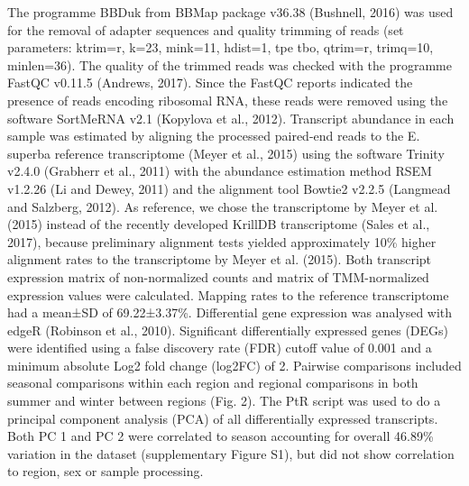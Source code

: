 The programme BBDuk from BBMap package v36.38 (Bushnell, 2016) was used for the
removal of adapter sequences and quality trimming of reads (set parameters:
ktrim=r, k=23, mink=11, hdist=1, tpe tbo, qtrim=r, trimq=10, minlen=36). The
quality of the trimmed reads was checked with the programme FastQC v0.11.5
(Andrews, 2017). Since the FastQC reports indicated the presence of reads
encoding ribosomal RNA, these reads were removed using the software SortMeRNA
v2.1 (Kopylova et al., 2012). Transcript abundance in each sample was estimated
by aligning the processed paired-end reads to the E. superba reference
transcriptome (Meyer et al., 2015) using the software Trinity v2.4.0 (Grabherr
et al., 2011) with the abundance estimation method RSEM v1.2.26 (Li and Dewey,
2011) and the alignment tool Bowtie2 v2.2.5 (Langmead and Salzberg, 2012). As
reference, we chose the transcriptome by Meyer et al. (2015) instead of the
recently developed KrillDB transcriptome (Sales et al., 2017), because
preliminary alignment tests yielded approximately 10\% higher alignment rates
to the transcriptome by Meyer et al. (2015). Both transcript expression matrix
of non-normalized counts and matrix of TMM-normalized expression values were
calculated. Mapping rates to the reference transcriptome had a mean±SD of
69.22±3.37\%. Differential gene expression was analysed with edgeR (Robinson et
al., 2010). Significant differentially expressed genes (DEGs) were identified
using a false discovery rate (FDR) cutoff value of 0.001 and a minimum absolute
Log2 fold change (log2FC) of 2. Pairwise comparisons included seasonal
comparisons within each region and regional comparisons in both summer and
winter between regions (Fig. 2). The PtR script was used to do a principal
component analysis (PCA) of all differentially expressed transcripts. Both PC 1
and PC 2 were correlated to season accounting for overall 46.89\% variation in
the dataset (supplementary Figure S1), but did not show correlation to region,
sex or sample processing.

